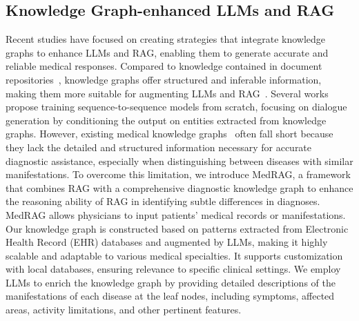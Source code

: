 \subsection{Knowledge Graph-enhanced LLMs and RAG}
Recent studies have focused on creating strategies that integrate knowledge graphs to enhance LLMs and RAG, enabling them to generate accurate and reliable medical responses. Compared to knowledge contained in document repositories~\cite{izacard2021unsupervised}, knowledge graphs offer structured and inferable information, making them more suitable for augmenting LLMs and RAG~\cite{li2018improving,varshney2023knowledge,luo2023reasoning, kang2023knowledge, jiang2023reasoninglm,zhong2023comprehensive,yu2021kg}. 
Several works~\cite{zhang2019grounded, wu2020diverse, tuan2019dykgchat, zhou2021earl,jiang2023reasoninglm,liu2021kg} propose training sequence-to-sequence models from scratch, focusing on dialogue generation by conditioning the output on entities extracted from knowledge graphs.
% 
However, existing medical knowledge graphs~\cite{zhao2021brain,gao2023leveraging,varshney2023knowledge,chandak2023building} often fall short because they lack the detailed and structured information necessary for accurate diagnostic assistance, especially when distinguishing between diseases with similar manifestations. To overcome this limitation, we introduce MedRAG, a framework that combines RAG with a comprehensive diagnostic knowledge graph to enhance the reasoning ability of RAG in identifying subtle differences in diagnoses. MedRAG allows physicians to input patients' medical records or manifestations.
Our knowledge graph is constructed based on patterns extracted from Electronic Health Record (EHR) databases and augmented by LLMs, making it highly scalable and adaptable to various medical specialties. It supports customization with local databases, ensuring relevance to specific clinical settings. We employ LLMs to enrich the knowledge graph by providing detailed descriptions of the manifestations of each disease at the leaf nodes, including symptoms, affected areas, activity limitations, and other pertinent features.